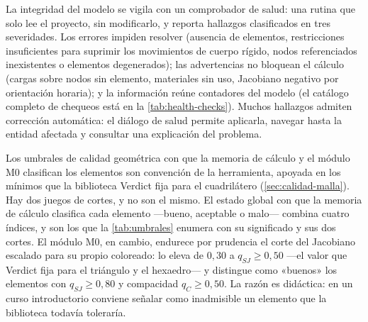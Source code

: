 La integridad del modelo se vigila con un comprobador de salud: una rutina que solo lee el proyecto, sin modificarlo, y reporta hallazgos clasificados en tres severidades. Los errores impiden resolver (ausencia de elementos, restricciones insuficientes para suprimir los movimientos de cuerpo rígido, nodos referenciados inexistentes o elementos degenerados); las advertencias no bloquean el cálculo (cargas sobre nodos sin elemento, materiales sin uso, Jacobiano negativo por orientación horaria); y la información reúne contadores del modelo (el catálogo completo de chequeos está en la \autoref{tab:health-checks}). Muchos hallazgos admiten corrección automática: el diálogo de salud permite aplicarla, navegar hasta la entidad afectada y consultar una explicación del problema.

Los umbrales de calidad geométrica con que la memoria de cálculo y el módulo M0 clasifican los elementos son convención de la herramienta, apoyada en los mínimos que la biblioteca Verdict fija para el cuadrilátero (\autoref{sec:calidad-malla}). Hay dos juegos de cortes, y no son el mismo. El estado global con que la memoria de cálculo clasifica cada elemento —bueno, aceptable o malo— combina cuatro índices, y son los que la \autoref{tab:umbrales} enumera con su significado y sus dos cortes. El módulo M0, en cambio, endurece por prudencia el corte del Jacobiano escalado para su propio coloreado: lo eleva de $0{,}30$ a $q_{SJ} \ge 0{,}50$ —el valor que Verdict fija para el triángulo y el hexaedro— y distingue como «buenos» los elementos con $q_{SJ} \ge 0{,}80$ y compacidad $q_C \ge 0{,}50$. La razón es didáctica: en un curso introductorio conviene señalar como inadmisible un elemento que la biblioteca todavía toleraría.

